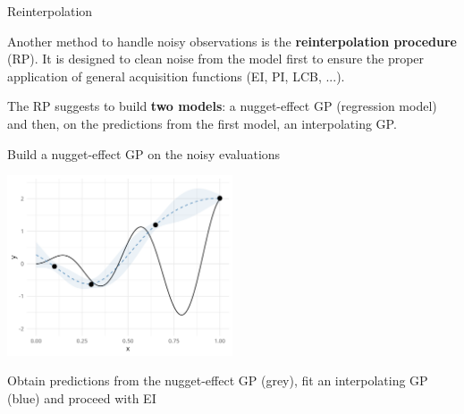 \documentclass[11pt,compress,t,notes=noshow, xcolor=table]{beamer}
\begin{document}
\begin{vbframe}{Reinterpolation}

Another method to handle noisy observations is the \textbf{reinterpolation procedure} (RP). It is designed to clean noise from the model first to ensure the proper application of general acquisition functions (EI, PI, LCB, ...). 

\lz 

The RP suggests to build \textbf{two models}: a nugget-effect GP (regression model) and then, on the predictions from the first model, an interpolating GP.

\begin{algorithm}[H]
\footnotesize
  \caption{Reinterpolation Procedure}
  \begin{algorithmic}[1]
  \end{algorithmic}
\end{algorithm}

\framebreak

Build a nugget-effect GP on the noisy evaluations

\vspace*{0.5cm}

\begin{center}
  \includegraphics[width = 0.5\textwidth]{figure_man/noisy_2.png}
\end{center}

\framebreak

Obtain predictions from the nugget-effect GP (grey), fit an interpolating GP (blue) and proceed with EI

\vspace*{0.5cm}


\end{vbframe}
\end{document}
